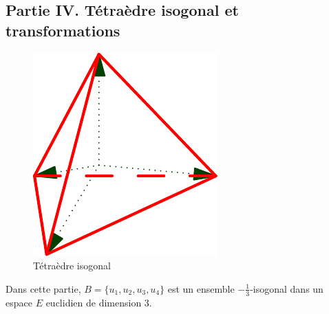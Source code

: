 \subsection*{Partie IV. Tétraèdre isogonal et transformations}
\begin{figure}[ht!]
 \centering
 \includegraphics{./Eisogo_2.pdf}
 \caption{Tétraèdre isogonal}
 \label{fig:Eisogo_2}
\end{figure}
Dans cette partie, $B=\{u_1,u_2,u_3,u_4\}$ est un ensemble $-\frac{1}{3}$-isogonal dans un espace $E$ euclidien de dimension $3$.
